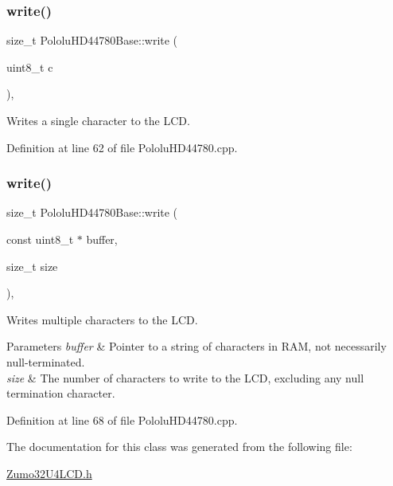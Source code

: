 \subsubsection{\texorpdfstring{write()}{write()}\hspace{0.1cm}{\footnotesize\ttfamily [1/2]}}
{\footnotesize\ttfamily size\+\_\+t Pololu\+H\+D44780\+Base\+::write (\begin{DoxyParamCaption}\item[{uint8\+\_\+t}]{c }\end{DoxyParamCaption})\hspace{0.3cm}{\ttfamily [virtual]}, {\ttfamily [inherited]}}

Writes a single character to the L\+CD. 

Definition at line 62 of file Pololu\+H\+D44780.\+cpp.

\mbox{\label{class_pololu_h_d44780_base_a965028ffd2313e9eaa968348effcab81}} 
\subsubsection{\texorpdfstring{write()}{write()}\hspace{0.1cm}{\footnotesize\ttfamily [2/2]}}
{\footnotesize\ttfamily size\+\_\+t Pololu\+H\+D44780\+Base\+::write (\begin{DoxyParamCaption}\item[{const uint8\+\_\+t $\ast$}]{buffer,  }\item[{size\+\_\+t}]{size }\end{DoxyParamCaption})\hspace{0.3cm}{\ttfamily [virtual]}, {\ttfamily [inherited]}}

Writes multiple characters to the L\+CD.


\begin{DoxyParams}{Parameters}
{\em buffer} & Pointer to a string of characters in R\+AM, not necessarily null-\/terminated. \\
\hline
{\em size} & The number of characters to write to the L\+CD, excluding any null termination character. \\
\hline
\end{DoxyParams}


Definition at line 68 of file Pololu\+H\+D44780.\+cpp.



The documentation for this class was generated from the following file\+:\begin{DoxyCompactItemize}
\item 
\hyperlink{_zumo32_u4_l_c_d_8h}{Zumo32\+U4\+L\+C\+D.\+h}\end{DoxyCompactItemize}
